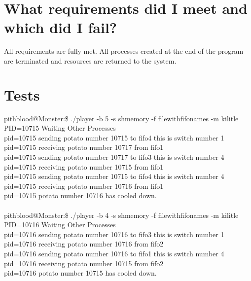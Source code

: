 \documentclass{article}
\begin{document}
\section{What requirements did I meet and which did I fail?}
\quad All requirements are fully met. All processes created at the end of the program are terminated and resources are returned to the system.\\


\section{Tests}

\quad pithblood@Monster:\$ ./player -b 5 -s shmemory -f filewithfifonames -m kilitle\\
PID=10715 Waiting Other Processes\\
pid=10715 sending potato number 10715 to fifo4 this is switch number 1\\
pid=10715 receiving potato number 10717 from fifo1\\
pid=10715 sending potato number 10717 to fifo3 this is switch number 4\\
pid=10715 receiving potato number 10715 from fifo1\\
pid=10715 sending potato number 10715 to fifo4 this is switch number 4\\
pid=10715 receiving potato number 10716 from fifo1\\
pid=10715 potato number 10716 has cooled down.\\\\

pithblood@Monster:\$ ./player -b 4 -s shmemory -f filewithfifonames -m kilitle\\
PID=10716 Waiting Other Processes\\
pid=10716 sending potato number 10716 to fifo3 this is switch number 1\\
pid=10716 receiving potato number 10716 from fifo2\\
pid=10716 sending potato number 10716 to fifo1 this is switch number 4\\
pid=10716 receiving potato number 10715 from fifo2\\
pid=10716 potato number 10715 has cooled down.\\\\
\end{document}
